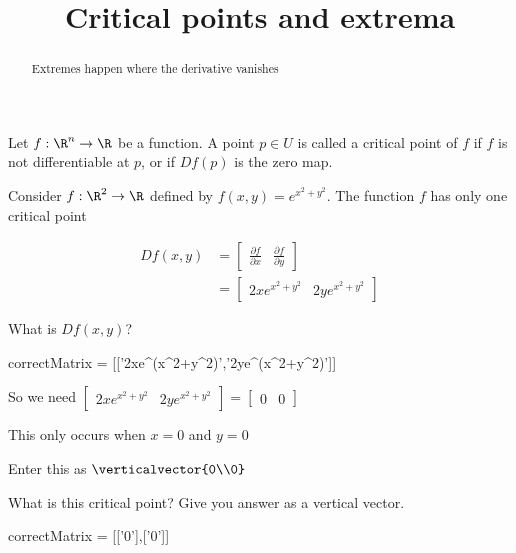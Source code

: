 \documentclass{ximera}
\title{Critical points and extrema}
\begin{document}
	\begin{abstract}
		Extremes happen where the derivative vanishes
	\end{abstract}
	
	
	\begin{definition}
		Let $f:\R^n \to \R $ be a function.  A point $p \in U$ is called a critical point of $f$ if $f$ is not differentiable at $p$, or if $Df(p)$ is the zero map.
	\end{definition}
	
	\begin{question}
		Consider \(f: \R^2 \to \R\) defined by $f(x,y) = e^{x^2+y^2}$.  The function $f$ has only one critical point
		\begin{solution}
			\begin{hint}
				\begin{question}
					\begin{solution}
						\begin{hint}
							\begin{align*}
								Df(x,y) &= \begin{bmatrix} \frac{\partial f}{\partial x} & \frac{\partial f}{\partial y}\end{bmatrix}\\
									&= \begin{bmatrix} 2xe^{x^2+y^2} & 2ye^{x^2+y^2}\end{bmatrix}
							\end{align*}
						\end{hint}
						What is $Df(x,y)$?
							\begin{matrix-answer}
								correctMatrix = [['2xe^(x^2+y^2)','2ye^(x^2+y^2)']]
							\end{matrix-answer}
					\end{solution}
				\end{question}
			\end{hint}
			\begin{hint}
				So we need \(\begin{bmatrix} 2xe^{x^2+y^2} & 2ye^{x^2+y^2}\end{bmatrix} = \begin{bmatrix} 0 & 0\end{bmatrix}\)
			\end{hint}
			\begin{hint}
				This only occurs when $x=0$ and $y=0$
			\end{hint}
			\begin{hint}
				Enter this as $\verticalvector{0\\0}$
			\end{hint}
			What is this critical point?  Give you answer as a vertical vector.
			\begin{matrix-answer}
				correctMatrix = [['0'],['0']]
			\end{matrix-answer}
		\end{solution}
	\end{question}
	
\end{document}
